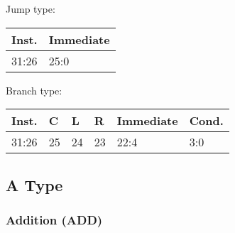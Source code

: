 \documentclass[12pt]{article}
\begin{document}
    \begin{center}
        Jump type:\\
        \vspace{1em}
        \begin{tabular}{ |p{1.8cm}|p{10.7cm}| }
            \hline
            \textbf{Inst.} & \textbf{Immediate}\\
            \hline
            31:26& 25:0\\
            \hline
        \end{tabular}
    \end{center}
    
    \begin{center}
        Branch type:\\
        \vspace{1em}
        \begin{tabular}{ |p{1.8cm}|p{.3cm}|p{.3cm}|p{.3cm}|p{6.5cm}|p{1.5cm}| }
            \hline
            \textbf{Inst.} & \textbf{C} &  \textbf{L} & \textbf{R}&\textbf{Immediate}&\textbf{Cond.}\\
            \hline
            31:26& 25 & 24 & 23 & 22:4 &3:0\\
            \hline
        \end{tabular}
    \end{center}
    
\newpage
\subsection{A Type}



    
    \subsubsection{Addition (ADD)}
    
\end{document}

